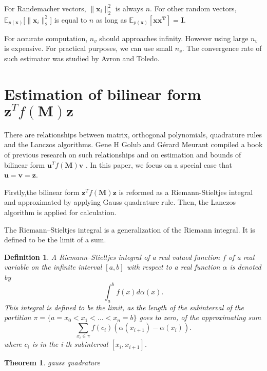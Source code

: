 \documentclass[senior,final,11pt]{iscs-thesis}
\newtheorem{theorem}{Theorem}
\newtheorem{definition}{Definition}
\begin{document}
For Randemacher vectors, $\|\mathbf{x}_i\|_2^2$ is always $n$. For other random vectors, $\mathbb{E}_{p(\mathbf{x})}[\|\mathbf{x}_i\|_2^2$]  is equal to $n$ as long as $\mathbb{E}_{p(\mathbf{x})}[\mathbf{xx^T}] = \mathbf{I}$.

For accurate computation, $n_v$ should approaches infinity. However  using large $n_v$ is expensive. For practical purposes, we can use small $n_v$. The convergence rate of such estimator was studied by Avron and Toledo\cite{avron2011randomized}.


\section{Estimation of bilinear form $\mathbf{z}^T f(\mathbf{M}) \mathbf{z}$} \label{bilinear}
There are relationships between matrix, orthogonal polynomials, quadrature rules and the Lanczos algorithms. Gene H Golub and G\'erard Meurant compiled a book of previous research on such relationships and on estimation and bounds of bilinear form $\mathbf{u}^T f(\mathbf{M}) \mathbf{v}$ \cite{golub2009matrices}. In this paper, we focus on a special case that $\mathbf{u}=\mathbf{v}=\mathbf{z}$.

Firstly,the bilinear form $\mathbf{z}^{T}f(\mathbf{M})\mathbf{z}$ is reformed as a Riemann-Stieltjes integral and approximated by applying Gauss quadrature rule. Then, the Lanczos algorithm is applied for calculation.

The Riemann–Stieltjes integral is a generalization of the Riemann integral. It is defined to be the limit of a sum.
\begin{definition}
    A Riemann–Stieltjes integral of a real valued function $f$ of a real variable on the infinite interval $[a,b]$ with respect to a real function $\alpha$ is denoted by
    \[ \int_a^b f(x) d\alpha (x). \]
    This integral is defined to be the limit, as the length of the subinterval of the partition $\pi=\{a=x_0 < x_1 < ... < x_n = b\}$ goes to zero, of the approximating sum
    \[ \sum_{x_i \in \pi} f(c_i)(\alpha(x_{i+1}) - \alpha(x_i)).\]
    where $c_i$ is in the i-th subinterval $[x_i, x_{i+1}]$.
\end{definition}

\begin{theorem}
    gauss quadrature
\end{theorem}
\end{document}
